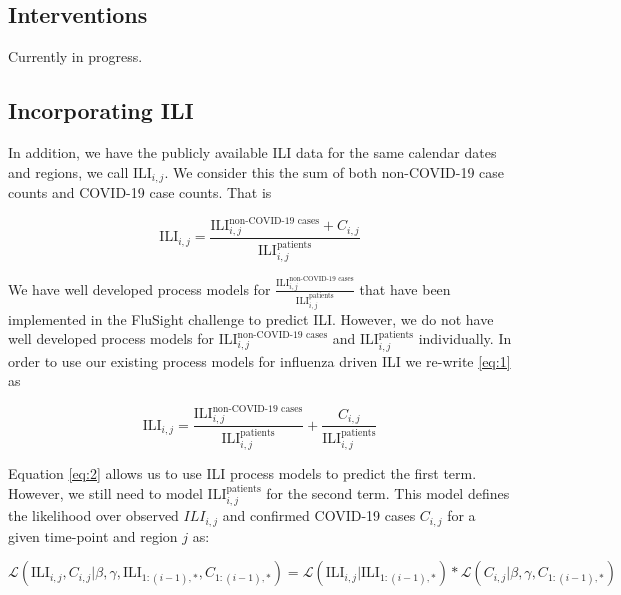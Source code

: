 \documentclass{article}
\begin{document}
\subsection{Interventions}

Currently in progress. 

\subsection{Incorporating ILI}

In addition, we have the publicly available ILI data for the same calendar dates and regions, we call $\text{ILI}_{i,j}$. We consider this the sum of both non-COVID-19 case counts and COVID-19 case counts. That is 

\begin{equation}
\text{ILI}_{i,j} = \frac{\text{ILI}^{\text{non-COVID-19 cases}}_{i,j} + C_{i,j}}{\text{ILI}^{\text{patients}}_{i,j}}
\label{eq:1}
\end{equation}

We have well developed process models for $\frac{\text{ILI}^{\text{non-COVID-19 cases}}_{i,j} }{\text{ILI}^{\text{patients}}_{i,j}}$ that have been implemented in the FluSight challenge to predict ILI. However, we do not have well developed process models for $\text{ILI}^{\text{non-COVID-19 cases}}_{i,j}$ and $\text{ILI}^{\text{patients}}_{i,j}$ individually.  In order to use our existing process models for influenza driven ILI we re-write \eqref{eq:1} as 


\begin{equation}
\text{ILI}_{i,j} = \frac{\text{ILI}^{\text{non-COVID-19 cases}}_{i,j}}{\text{ILI}^{\text{patients}}_{i,j}} + \frac{C_{i,j}}{\text{ILI}^{\text{patients}}_{i,j}}
\label{eq:2}
\end{equation}

Equation \eqref{eq:2} allows us to use ILI process models to predict the first term. However, we still need to model $\text{ILI}^{\text{patients}}_{i,j}$ for the second term. 
This model defines the likelihood over observed $ILI_{i,j}$ and confirmed COVID-19 cases $C_{i,j}$ for a given time-point and region $j$ as:

\begin{equation}
\mathcal{L}(\text{ILI}_{i,j},C_{i,j} | \beta, \gamma,\text{ILI}_{1:(i-1),*},C_{1:(i-1),*}) = \mathcal{L}(\text{ILI}_{i,j} | \text{ILI}_{1:(i-1),*}) *\mathcal{L}(C_{i,j}  | \beta, \gamma,C_{1:(i-1),*})
\end{equation}
\end{document}
